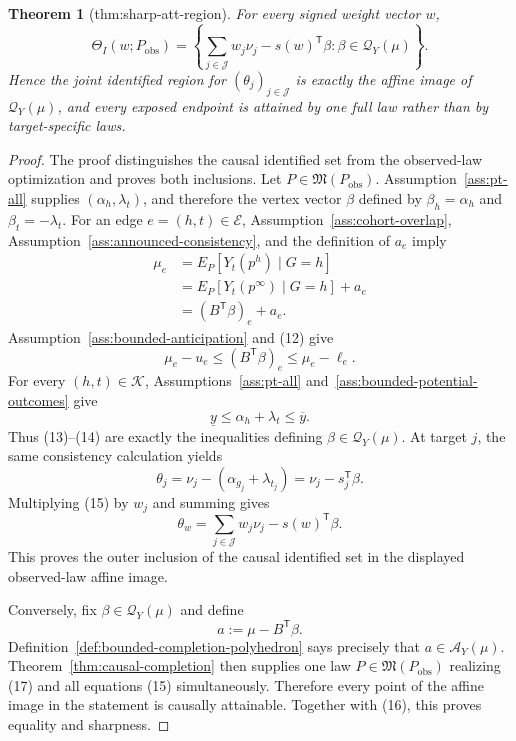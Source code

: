 \documentclass{article}
\newtheorem{theorem}{Theorem}
\begin{document}
\begin{theorem}[thm:sharp-att-region]\label{thm:sharp-att-region}
For every signed weight vector \(w\),
\[
 \Theta_I(w;P_{\mathrm{obs}})
 =\left\{\sum_{j\in\mathcal J}w_j\nu_j-s(w)^{\mathsf T}\beta:
 \beta\in\mathcal Q_Y(\mu)\right\}.
\]
Hence the joint identified region for \((\theta_j)_{j\in\mathcal J}\) is exactly the affine image of \(\mathcal Q_Y(\mu)\), and every exposed endpoint is attained by one full law rather than by target-specific laws.
\end{theorem}
\begin{proof}
The proof distinguishes the causal identified set from the observed-law optimization and proves both inclusions.  Let \(P\in\mathfrak M(P_{\mathrm{obs}})\).  Assumption~\ref{ass:pt-all} supplies \((\alpha_h,\lambda_t)\), and therefore the vertex vector \(\beta\) defined by \(\beta_h=\alpha_h\) and \(\beta_t=-\lambda_t\).  For an edge \(e=(h,t)\in\mathcal E\), Assumption~\ref{ass:cohort-overlap}, Assumption~\ref{ass:announced-consistency}, and the definition of \(a_e\) imply
\[
 \begin{aligned}
 \mu_e
 &=E_P[Y_t(p^h)\mid G=h]\\
 &=E_P[Y_t(p^\infty)\mid G=h]+a_e\\
 &=(B^{\mathsf T}\beta)_e+a_e.
 \end{aligned}
\tag{12}
\]
Assumption~\ref{ass:bounded-anticipation} and (12) give
\[
 \mu_e-u_e\le(B^{\mathsf T}\beta)_e\le\mu_e-\ell_e.
\tag{13}
\]
For every \((h,t)\in\mathcal K\), Assumptions~\ref{ass:pt-all} and~\ref{ass:bounded-potential-outcomes} give
\[
 \underline y\le\alpha_h+\lambda_t\le\overline y.
\tag{14}
\]
Thus (13)--(14) are exactly the inequalities defining \(\beta\in\mathcal Q_Y(\mu)\).  At target \(j\), the same consistency calculation yields
\[
 \theta_j=\nu_j-(\alpha_{g_j}+\lambda_{t_j})
 =\nu_j-s_j^{\mathsf T}\beta.
\tag{15}
\]
Multiplying (15) by \(w_j\) and summing gives
\[
 \theta_w=\sum_{j\in\mathcal J}w_j\nu_j-s(w)^{\mathsf T}\beta.
\tag{16}
\]
This proves the outer inclusion of the causal identified set in the displayed observed-law affine image.

Conversely, fix \(\beta\in\mathcal Q_Y(\mu)\) and define
\[
 a:=\mu-B^{\mathsf T}\beta.
\tag{17}
\]
Definition~\ref{def:bounded-completion-polyhedron} says precisely that \(a\in\mathcal A_Y(\mu)\).  Theorem~\ref{thm:causal-completion} then supplies one law \(P\in\mathfrak M(P_{\mathrm{obs}})\) realizing (17) and all equations (15) simultaneously.  Therefore every point of the affine image in the statement is causally attainable.  Together with (16), this proves equality and sharpness.


\end{proof}
\end{document}
